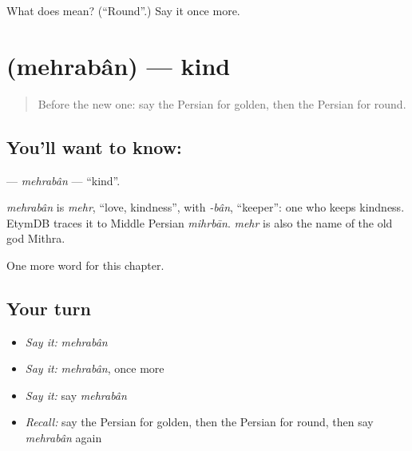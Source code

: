 \begin{tcolorbox}[breakable,colback=teal!4,colframe=teal!35!black,title={Before you move on}]
What does  mean? (\textquotedblleft{}Round\textquotedblright{}.) Say it once more.
\end{tcolorbox}
\section[\texorpdfstring{\fa{مهربان} (mehrabân)}{مهربان (mehrabân)}]{ (mehrabân) — kind}

\label{lesson:FA-C128-mehraban}



\begin{quote}
Before the new one: say the Persian for golden, then the Persian for round.
\end{quote}

\subsection*{You'll want to know: }
\textbf{} — \emph{mehrabân} — \textquotedblleft{}kind\textquotedblright{}.

\begin{cousinweb}
\emph{mehrabân} is \emph{mehr}, \textquotedblleft{}love, kindness\textquotedblright{}, with \emph{-bân}, \textquotedblleft{}keeper\textquotedblright{}: one who keeps kindness. EtymDB traces it to Middle Persian \emph{mihrbān}. \emph{mehr} is also the name of the old god Mithra.
\end{cousinweb}

\begin{grammarlens}[title={What you've built}]
One more word for this chapter.
\end{grammarlens}

\subsection*{Your turn}
\begin{itemize}
\raggedright
  \item \emph{Say it:} \emph{mehrabân}
  \item \emph{Say it:} \emph{mehrabân}, once more
  \item \emph{Say it:} say \emph{mehrabân}
  \item \emph{Recall:} say the Persian for golden, then the Persian for round, then say \emph{mehrabân} again
\end{itemize}


